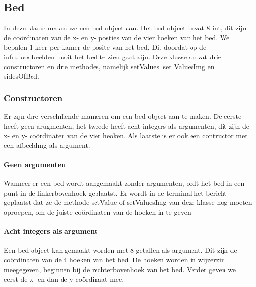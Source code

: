 \subsection{Bed}
\label{mRefBed}
In deze klasse maken we een bed object aan. Het bed object bevat 8 int, dit zijn de co\"ordinaten van de x- en y- posties van de vier hoeken van het bed. We bepalen 1 keer per kamer de posite van het bed. Dit doordat op de infraroodbeelden nooit het bed te zien gaat zijn. Deze klasse omvat drie constructoren en drie methodes, namelijk setValues, set ValuesImg en sidesOfBed.

\subsubsection{Constructoren}
Er zijn dire verschillende manieren om een bed object aan te maken. De eerste heeft geen arugmenten, het tweede heeft acht integers als argumenten, dit zijn de x- en y- co\"ordinaten van de vier heoken. Als laatste is er ook een contructor met een afbeelding als argument. 

\paragraph{Geen argumenten}
Wanneer er een bed wordt aangemaakt zonder argumenten, ordt het bed in een punt in de linkerbovenhoek geplaatst. Er wordt in de terminal het bericht geplaatst dat ze de methode setValue of setValuesImg van deze klasse nog moeten oproepen, om de juiste co\"ordinaten van de hoeken in te geven. 

\paragraph{Acht integers als argument}
Een bed object kan gemaakt worden met 8 getallen als argument. Dit zijn de co\"ordinaten van de 4 hoeken van het bed. De hoeken worden in wijzerzin meegegeven, beginnen bij de rechterbovenhoek van het bed. Verder geven we eerst de x- en dan de y-co\"ordinaat mee.

